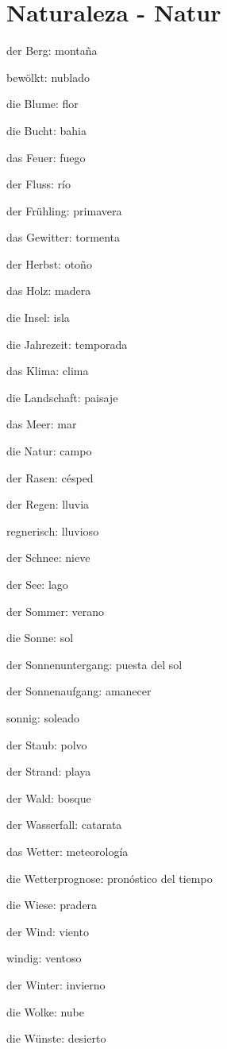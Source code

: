 \section{Naturaleza - Natur}
\begin{multicols}{2}
\begin{myitemize}
\item der Berg: montaña
\item bewölkt: nublado
\item die Blume: flor
\item die Bucht: bahia
\item das Feuer: fuego
\item der Fluss: río
\item der Frühling: primavera
\item das Gewitter: tormenta
\item der Herbst: otoño
\item das Holz: madera
\item die Insel: isla
\item die Jahrezeit: temporada
\item das Klima: clima
\item die Landschaft: paisaje
\item das Meer: mar
\item die Natur: campo
\item der Rasen: césped
\item der Regen: lluvia
\item regnerisch: lluvioso
\item der Schnee: nieve
\item der See: lago
\item der Sommer: verano
\item die Sonne: sol
\item der Sonnenuntergang: puesta del sol
\item der Sonnenaufgang: amanecer
\item sonnig: soleado
\item der Staub: polvo
\item der Strand: playa
\item der Wald: bosque
\item der Wasserfall: catarata
\item das Wetter: meteorología
\item die Wetterprognose: pronóstico del tiempo
\item die Wiese: pradera
\item der Wind: viento
\item windig: ventoso
\item der Winter: invierno
\item die Wolke: nube
\item die Wünste: desierto
\end{myitemize}
\end{multicols}


